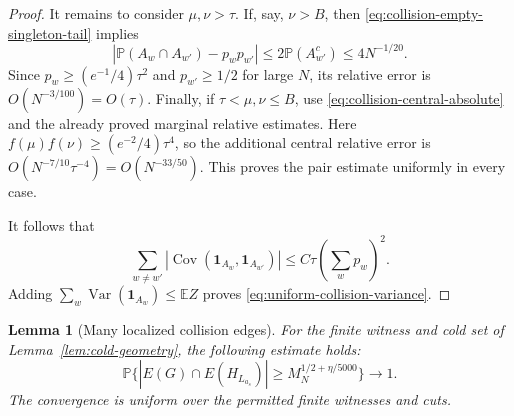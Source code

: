 \documentclass[11pt]{article}
\numberwithin{equation}{section}
\newtheorem{lemma}[theorem]{Lemma}
\theoremstyle{definition}
\theoremstyle{remark}
\newcommand{\E}{\mathbb E}
\newcommand{\Pp}{\mathbb P}
\newcommand{\Var}{\operatorname{Var}}
\newcommand{\1}{\mathbf 1}
\begin{document}
\begin{proof}
It remains to consider $\mu,\nu>\tau$. If, say, $\nu>B$, then
\eqref{eq:collision-empty-singleton-tail} implies
\[
 |\Pp(A_w\cap A_{w'})-p_wp_{w'}|
 \le2\Pp(A_{w'}^c)\le4N^{-1/20}.
\]
Since $p_w\ge(e^{-1}/4)\tau^2$ and $p_{w'}\ge1/2$ for large $N$, its relative
error is $O(N^{-3/100})=O(\tau)$.
Finally, if $\tau<\mu,\nu\le B$, use
\eqref{eq:collision-central-absolute} and the already proved marginal
relative estimates. Here $f(\mu)f(\nu)\ge(e^{-2}/4)\tau^4$, so the additional
central relative error is
$O(N^{-7/10}\tau^{-4})=O(N^{-33/50})$.
This proves the pair estimate uniformly in every case.

It follows that
\[
 \sum_{w\ne w'}|\operatorname{Cov}(\mathbf 1_{A_w},\mathbf 1_{A_{w'}})|
 \le C\tau\left(\sum_w p_w\right)^2.
\]
Adding $\sum_w\Var(\mathbf 1_{A_w})\le\E Z$ proves
\eqref{eq:uniform-collision-variance}.
\end{proof}

\begin{lemma}[Many localized collision edges]
\label{lem:many-edges}
For the finite witness and cold set of Lemma~\ref{lem:cold-geometry},
the following estimate holds:
\[
 \Pp\{|E(G)\cap E(H_{L_{a_s}})|\ge M_N^{1/2+\eta/5000}\}
 \longrightarrow1.
\]
The convergence is uniform over the permitted finite witnesses and cuts.
\end{lemma}
\end{document}
